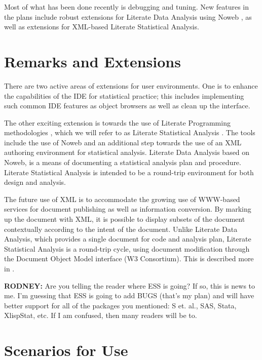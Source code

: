 \documentclass{article}
\begin{document}
Most of what has been done recently is debugging and tuning.  New
features in the plans include robust extensions for Literate Data
Analysis using Noweb \citep{NRamsey:1994}, as well as extensions for
XML-based Literate Statistical Analysis.

\section{Remarks and Extensions}
\label{sec:remarks}

There are two active areas of extensions for user environments.  One
is to enhance the capabilities of the IDE for statistical practice;
this includes implementing such common IDE features as object browsers
as well as clean up the interface.

The other exciting extension is towards the use of Literate
Programming methodologies \citep{Knuth:1992,NRamsey:1994}, which we
will refer to as Literate Statistical Analysis \citep{ross:lunt:2001}.
The tools include the use of Noweb \citep{NRamsey:1994} and an
additional step towards the use of an XML authoring environment for
statistical analysis.  Literate Data Analysis based on Noweb, is a
means of documenting a statistical analysis plan and procedure.
Literate Statistical Analysis is intended to be a round-trip
environment for both design and analysis.

The future use of XML is to accommodate the growing use of WWW-based
services for document publishing as well as information conversion.
By marking up the document with XML, it is possible to display subsets
of the document contextually according to the intent of the document.
Unlike Literate Data Analysis, which provides a single document for
code and analysis plan, Literate Statistical Analysis is a round-trip
cycle, using document modification through the Document Object Model
interface (W3 Consortium).  This is described more in
\citep{ross:lunt:2001}. 

\textbf{RODNEY:} Are you telling the reader where ESS is going?  If
so, this is news to me.  I'm guessing that ESS is going to add BUGS
(that's my plan) and will have better support for all of the packages
you mentioned: S et.  al., SAS, Stata, XlispStat, etc.  If I am
confused, then many readers will be to.



\appendix


\section{Scenarios for Use}
\label{app:scenarios}
\end{document}
